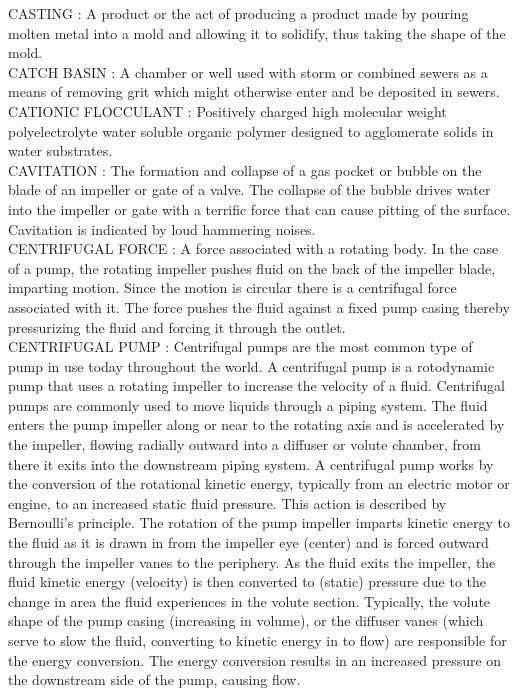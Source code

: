 \vspace{0.15cm}
CASTING :   A product or the act of producing a product made by pouring molten metal into a mold and allowing it to solidify, thus taking the shape of the mold.\\
\vspace{0.15cm}
CATCH BASIN :  A chamber or well used with storm or combined sewers as a means of removing grit which might otherwise enter and be deposited in sewers. \\
\vspace{0.15cm}
CATIONIC FLOCCULANT :  Positively charged high molecular weight polyelectrolyte water soluble organic polymer designed to agglomerate solids in water substrates.\\
\vspace{0.15cm}
CAVITATION :  The formation and collapse of a gas pocket or bubble on the blade of an impeller or gate of a valve. The collapse of the bubble drives water into the impeller or gate with a terrific force that can cause pitting of the surface. Cavitation is indicated by loud hammering noises.\\
\vspace{0.15cm}
CENTRIFUGAL FORCE :   A force associated with a rotating body. In the case of a pump, the rotating impeller pushes fluid on the back of the impeller blade, imparting motion. Since the motion is circular there is a centrifugal force associated with it. The force pushes the fluid against a fixed pump casing thereby pressurizing the fluid and forcing it through the outlet.\\
\vspace{0.15cm}
CENTRIFUGAL PUMP :   Centrifugal pumps are the most common type of pump in use today throughout the world. A centrifugal pump is a rotodynamic pump that uses a rotating impeller to increase the velocity of a fluid. Centrifugal pumps are commonly used to move liquids through a piping system. The fluid enters the pump impeller along or near to the rotating axis and is accelerated by the impeller, flowing radially outward into a diffuser or volute chamber, from there it exits into the downstream piping system. A centrifugal pump works by the conversion of the rotational kinetic energy, typically from an electric motor or engine, to an increased static fluid pressure. This action is described by Bernoulli’s principle. The rotation of the pump impeller imparts kinetic energy to the fluid as it is drawn in from the impeller eye (center) and is forced outward through the impeller vanes to the periphery. As the fluid exits the impeller, the fluid kinetic energy (velocity) is then converted to (static) pressure due to the change in area the fluid experiences in the volute section. Typically, the volute shape of the pump casing (increasing in volume), or the diffuser vanes (which serve to slow the fluid, converting to kinetic energy in to flow) are responsible for the energy conversion. The energy conversion results in an increased pressure on the downstream side of the pump, causing flow.\\

